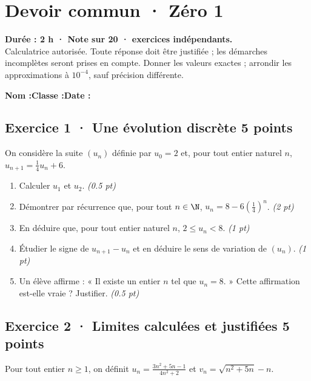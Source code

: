 \mxnewpage{}\label{sujet:3-1}

\section*{Devoir commun · Zéro 1}


\textbf{Durée : 2 h · Note sur 20 ·  exercices indépendants.}\\Calculatrice autorisée. Toute réponse doit être justifiée ; les démarches incomplètes seront prises en compte. Donner les valeurs exactes ; arrondir les approximations à $10^{-4}$, sauf précision différente.

\smallskip\textbf{Nom :}\enspace\dotfill\quad\textbf{Classe :}\enspace\dotfill\quad\textbf{Date :}\enspace\dotfill

\subsection*{Exercice 1 · Une évolution discrète \hfill 5 points}On considère la suite $(u_n)$ définie par $u_0=2$ et, pour tout entier naturel $n$, $u_{n+1}=\frac{1}{4}u_n+6$.

\begin{enumerate}

\item Calculer $u_1$ et $u_2$. \hfill\textit{(\num{0,5} pt)}

\item Démontrer par récurrence que, pour tout $n\in\N$, $u_n=8-6\left(\frac{1}{4}\right)^n$. \hfill\textit{(2 pt)}

\item En déduire que, pour tout entier naturel $n$, $2\le u_n<8$. \hfill\textit{(1 pt)}

\item Étudier le signe de $u_{n+1}-u_n$ et en déduire le sens de variation de $(u_n)$. \hfill\textit{(1 pt)}

\item Un élève affirme : « Il existe un entier $n$ tel que $u_n=8$. » Cette affirmation est-elle vraie ? Justifier. \hfill\textit{(\num{0,5} pt)}

\end{enumerate}

\subsection*{Exercice 2 · Limites calculées et justifiées \hfill 5 points}Pour tout entier $n\ge1$, on définit $u_n=\frac{3n^2+5n-1}{4n^2+2}$ et $v_n=\sqrt{n^2+5n}-n$.

